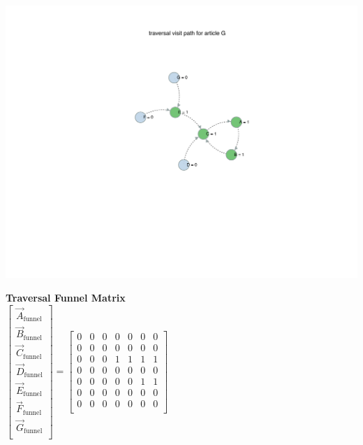 \documentclass[a4paper, 12pt]{article}
\newcommand{\bt}[1]{\textbf{#1}} %
\begin{document}
{\includegraphics[width=\textwidth]{traversal_algo_G.pdf}    
\vspace{1cm}


{\large \bt{Traversal Funnel Matrix}}\\


$\begin{bmatrix}
   \vec A_{\text{funnel}}   \\
   \vec    B_{\text{funnel}}   \\
   \vec C_{\text{funnel}}   \\
   \vec D_{\text{funnel}}   \\
   \vec E_{\text{funnel}}   \\
    \vec F_{\text{funnel}}   \\
    \vec G_{\text{funnel}}   \\
\end{bmatrix}
= 
\begin{bmatrix}
    0 & 0 & 0 & 0 & 0 & 0 & 0\\
    0 & 0 & 0 & 0 & 0 & 0 & 0\\
    0 & 0 & 0 & 1 & 1 & 1 & 1\\
    0 & 0 & 0 & 0 & 0 & 0 & 0\\
    0 & 0 & 0 & 0 & 0 & 1 & 1\\ %
    0 & 0 & 0 & 0 & 0 & 0 & 0\\
    0 & 0 & 0 & 0 & 0 & 0 & 0\\
\end{bmatrix}
$
\vspace{2cm}


}
\end{document}
